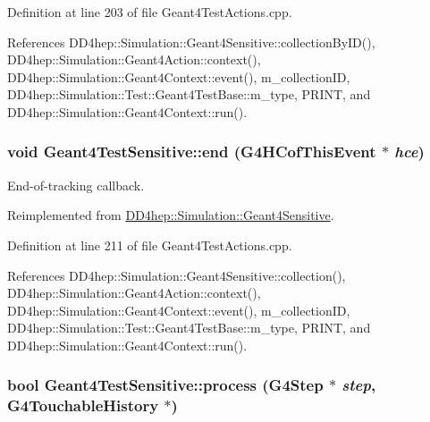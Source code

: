 Definition at line 203 of file Geant4TestActions.cpp.

References DD4hep::Simulation::Geant4Sensitive::collectionByID(), DD4hep::Simulation::Geant4Action::context(), DD4hep::Simulation::Geant4Context::event(), m\_\-collectionID, DD4hep::Simulation::Test::Geant4TestBase::m\_\-type, PRINT, and DD4hep::Simulation::Geant4Context::run().\hypertarget{class_d_d4hep_1_1_simulation_1_1_test_1_1_geant4_test_sensitive_accc5a2ae9369d9847ac25a01b55e6350}{
\subsubsection[{end}]{\setlength{\rightskip}{0pt plus 5cm}void Geant4TestSensitive::end (G4HCofThisEvent $\ast$ {\em hce})}}
\label{class_d_d4hep_1_1_simulation_1_1_test_1_1_geant4_test_sensitive_accc5a2ae9369d9847ac25a01b55e6350}


End-\/of-\/tracking callback. 

Reimplemented from \hyperlink{class_d_d4hep_1_1_simulation_1_1_geant4_sensitive_abcce05101539a9941c06aada4625a608}{DD4hep::Simulation::Geant4Sensitive}.

Definition at line 211 of file Geant4TestActions.cpp.

References DD4hep::Simulation::Geant4Sensitive::collection(), DD4hep::Simulation::Geant4Action::context(), DD4hep::Simulation::Geant4Context::event(), m\_\-collectionID, DD4hep::Simulation::Test::Geant4TestBase::m\_\-type, PRINT, and DD4hep::Simulation::Geant4Context::run().\hypertarget{class_d_d4hep_1_1_simulation_1_1_test_1_1_geant4_test_sensitive_aa5d824cbc3f5bfdd8e03236c8aec07ed}{
\subsubsection[{process}]{\setlength{\rightskip}{0pt plus 5cm}bool Geant4TestSensitive::process (G4Step $\ast$ {\em step}, \/  G4TouchableHistory $\ast$)}}
\label{class_d_d4hep_1_1_simulation_1_1_test_1_1_geant4_test_sensitive_aa5d824cbc3f5bfdd8e03236c8aec07ed}


